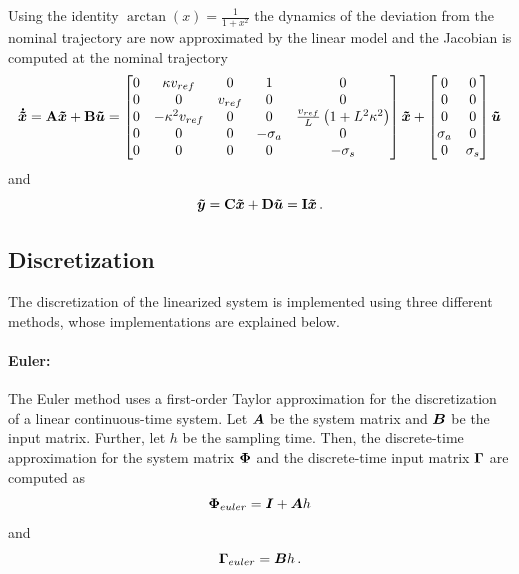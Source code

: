 Using the identity $\arctan(x) = \frac{1}{1 + x^2}$ the dynamics of the deviation from the nominal trajectory are now approximated by the linear model and the Jacobian is computed at the nominal trajectory
\begin{equation}
	\boldsymbol{\dot{\tilde{x}}} = \mathbf{A}\boldsymbol{\tilde{x}} + \mathbf{B}\boldsymbol{\tilde{u}} = \begin{bmatrix}
		0 & \kappa v_{ref} & 0 & 1 & 0\\
		0 & 0 & v_{ref} & 0 & 0\\
		0 & -\kappa^2 v_{ref} & 0 & 0 & \frac{v_{ref}}{L} \left(1 + L^2 \kappa^2\right)\\
		0 & 0 & 0 & -\sigma_a & 0\\
		0 & 0 & 0 & 0 & -\sigma_s
	\end{bmatrix} \boldsymbol{\tilde{x}} + \begin{bmatrix}
		0&0\\
		0&0\\
		0&0\\
		\sigma_a & 0\\
		0 & \sigma_s
	\end{bmatrix} \boldsymbol{\tilde{u}}
\end{equation}
and
\begin{equation}
	\boldsymbol{\tilde{y}} = \mathbf{C}\boldsymbol{\tilde{x}} + \mathbf{D}\boldsymbol{\tilde{u}} = \mathbf{I}\boldsymbol{\tilde{x}}\, .
\end{equation}

\subsection{Discretization}
The discretization of the linearized system is implemented using three different methods, whose implementations are explained below.

\paragraph{Euler:} The Euler method uses a first-order Taylor approximation for the discretization of a linear continuous-time system.
Let $\boldsymbol{A}$ be the system matrix and $\boldsymbol{B}$ be the input matrix.
Further, let $h$ be the sampling time. 
Then, the discrete-time approximation for the system matrix $\boldsymbol{\Phi}$ and the discrete-time input matrix $\boldsymbol{\Gamma}$ are computed as
\begin{equation}
	\boldsymbol{\Phi}_{euler} = \boldsymbol{I} + \boldsymbol{A}h
\end{equation}
and
\begin{equation}
	\boldsymbol{\Gamma}_{euler} = \boldsymbol{B}h \, .
\end{equation}

